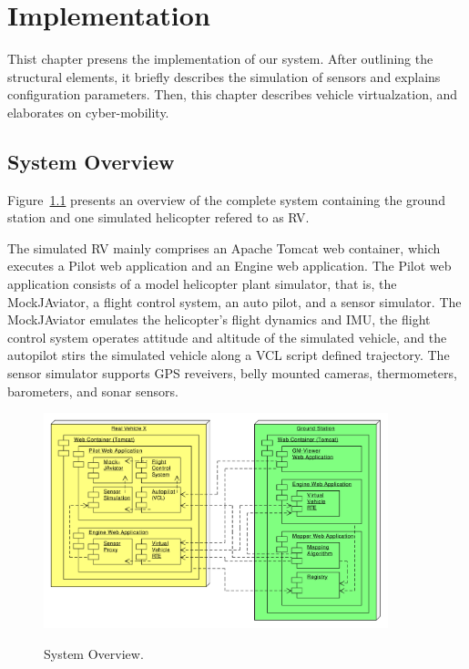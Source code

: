 
\chapter{Implementation}

Thist chapter presens the implementation of our system.
After outlining the structural elements, it briefly describes the simulation of sensors and explains
configuration parameters. Then, this chapter describes vehicle virtualzation, and elaborates on cyber-mobility.

\section{System Overview}

Figure~\ref{fig:SystemOverview} presents an overview of the complete system containing
the ground station and one simulated helicopter refered to as \ac{RV}.

The simulated \ac{RV} mainly comprises an Apache Tomcat web container, which executes a
Pilot web application and an Engine web application.
%
The Pilot web application consists of a model helicopter plant simulator, that is, the MockJAviator,
a flight control system, an auto pilot, and a sensor simulator.
The MockJAviator emulates the helicopter's flight dynamics and \ac{IMU},
the flight control system operates attitude and altitude of the simulated vehicle, 
and the autopilot stirs the simulated vehicle along a \ac{VCL} script defined trajectory.
The sensor simulator supports GPS reveivers, belly mounted cameras, thermometers, barometers,
and sonar sensors.
\begin{figure}[h]
	\begin{center}
		{\includegraphics[width=10cm]{SystemOverview.pdf}}
	\end{center}
	\caption{System Overview.\label{fig:SystemOverview}}
\end{figure}

